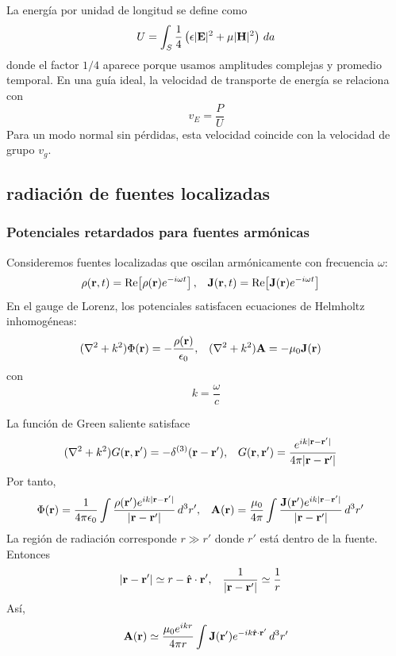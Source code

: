 \documentclass[]{article}
\numberwithin{equation}{section}
\begin{document}
La energía por unidad de longitud se define como
\begin{equation}
	U = \int_{S} \frac{1}{4} \left(\epsilon |\mathbf{E}|^2 + \mu |\mathbf{H}|^2\right) \, da
\end{equation}
donde el factor $1/4$ aparece porque usamos amplitudes complejas y promedio temporal. En una guía ideal, la velocidad de transporte de energía se relaciona con
\begin{equation}
	v_E = \frac{P}{U}
\end{equation}
Para un modo normal sin pérdidas, esta velocidad coincide con la velocidad de grupo $v_g$.

\subsection{radiación de fuentes localizadas}
\subsubsection{Potenciales retardados para fuentes armónicas}
Consideremos fuentes localizadas que oscilan armónicamente con frecuencia $\omega$:
\begin{align*}
	\rho(\mathbf{r},t) &= \mathrm{Re}\!\left[\rho(\mathbf{r}) e^{-i \omega t}\right], & \mathbf{J}(\mathbf{r},t) &= \mathrm{Re}\!\left[\mathbf{J}(\mathbf{r}) e^{-i \omega t}\right]
\end{align*}
En el gauge de Lorenz, los potenciales satisfacen ecuaciones de Helmholtz inhomogéneas:
\begin{align*}
	(\nabla^2 + k^2)\Phi(\mathbf{r}) &= -\frac{\rho(\mathbf{r})}{\epsilon_{0}}, & (\nabla^2 + k^2)\mathbf{A} &= -\mu_{0}\mathbf{J}(\mathbf{r})
\end{align*}
con
\begin{equation*}
	k = \frac{\omega}{c}
\end{equation*}

La función de Green saliente satisface
\begin{align*}
	(\nabla^2 + k^2)G(\mathbf{r},\mathbf{r}') &= -\delta^{(3)}(\mathbf{r} - \mathbf{r}'), & G(\mathbf{r},\mathbf{r}') &= \frac{e^{i k |\mathbf{r} - \mathbf{r}'|}}{4\pi|\mathbf{r} - \mathbf{r}'|}
\end{align*}
Por tanto,
\begin{align*}
	\Phi(\rv) &= \ke \int \frac{\rho(\rv') e^{i k |\rdif|}}{|\rdif|} \, d^3 r', & \n{A}(\rv) &= \ku \int \frac{\n{J}(\rv') e^{i k |\rdif|}}{|\rdif|} \, d^3 r'
\end{align*}
La región de radiación corresponde $r \gg r'$ donde $r'$ está dentro de la fuente. Entonces
\begin{align*}
	|\mathbf{r} - \mathbf{r}'| &\simeq r - \hat{\mathbf{r}}\cdot\mathbf{r}', & \frac{1}{|\mathbf{r} - \mathbf{r}'|} &\simeq \frac{1}{r}
\end{align*}
Así,
\begin{equation}
	\mathbf{A}(\mathbf{r}) \simeq \frac{\mu_{0} e^{i k r}}{4 \pi r} \int \mathbf{J}(\mathbf{r}') e^{- i k \hat{\mathbf{r}}\cdot\mathbf{r}'} \, d^3 r' \label{A_107}
\end{equation}
\end{document}
